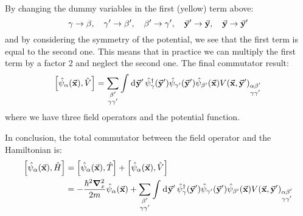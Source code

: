 \documentclass[../main/main.tex]{subfiles}
\begin{document}
By changing the dummy variables in the first (yellow) term above:
\begin{equation*}
  \gamma \rightarrow \beta, \quad \gamma' \rightarrow \beta', \quad \beta' \rightarrow \gamma', \quad \va{y}' \rightarrow \va{y}, \quad  \va{y}\rightarrow \va{y}'
\end{equation*}
and by considering the symmetry of the potential,
we see that the first term is equal to the second one. This means that in practice we can multiply the first term by a factor 2 and neglect the second one. The final commutator result:
\begin{equation}
  \qty[\hat{\psi }_ \alpha (\va{x}), \hat{V}  ] =
  \sum_{\substack{\beta'  \\ \gamma  \gamma'  } }^{}
  \int_{}^{} \dd[]{\va{y}'}
  \hat{\psi }_ \gamma ^\dag (\va{y}')  \hat{\psi }_ {\gamma'}  (\va{y}') \hat{\psi }_{\beta'} (\va{x}) V(\va{x},\va{y}')_{\substack{ \alpha \beta' \\ \gamma  \gamma'  } }
\end{equation}
where we have three field operators and the potential function.

In conclusion, the total commutator between the field operator and the Hamiltonian is:   
\begin{equation}
\begin{split}
    \qty[\hat{\psi }_ \alpha (\va{x}), \hat{H}  ]&=   \qty[\hat{\psi }_ \alpha (\va{x}), \hat{T}  ] +   \qty[\hat{\psi }_ \alpha (\va{x}), \hat{V}  ] \\
    &= - \frac{\hbar ^2 \grad ^2_x}{2m} \hat{\psi }_ \alpha (\va{x}) +
    \sum_{\substack{\beta'  \\ \gamma  \gamma'  } }^{}
    \int_{}^{} \dd[]{\va{y}'}
    \hat{\psi }_ \gamma ^\dag (\va{y}')  \hat{\psi }_ {\gamma'} (\va{y}') \hat{\psi }_{\beta'} (\va{x}) V(\va{x},\va{y}')_{\substack{ \alpha \beta' \\ \gamma  \gamma'  } }
\end{split}
\end{equation}
\end{document}
